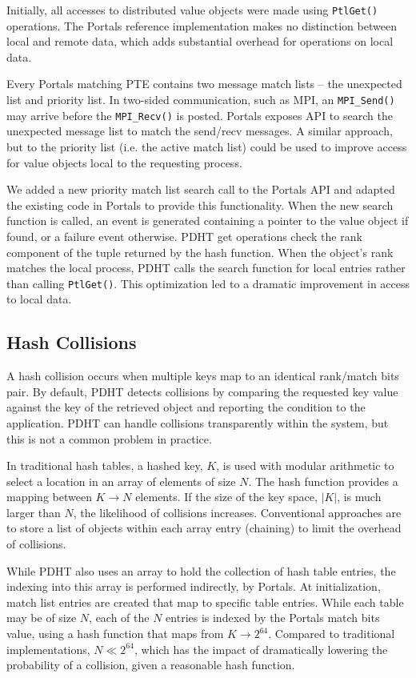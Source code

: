 {} Initially, all accesses to
distributed value objects were made using {\tt PtlGet()} operations. The
Portals reference implementation makes no distinction between local and remote
data, which adds substantial overhead for operations on local data.  

Every Portals matching PTE contains two message match lists -- the unexpected
list and priority list. In two-sided communication, such as MPI, an 
{\tt MPI\_Send()} may arrive before the {\tt MPI\_Recv()} is posted. Portals
exposes API to search the unexpected message list to match the send/recv 
messages. A similar approach, but to the priority list (i.e. the active match
list) could be used to improve access for value objects local to the requesting
process.

We added a new priority match list search call to the Portals API and adapted
the existing code in Portals to provide this functionality. When the new search
function is called, an event is generated containing a pointer to the value
object if found, or a failure event otherwise. PDHT get operations check the
rank component of the tuple returned by the hash function. When the object's
rank matches the local process, PDHT calls the search function for local
entries rather than calling {\tt PtlGet()}. This optimization led to a dramatic
improvement in access to local data.

\subsection{Hash Collisions} 

A hash collision occurs when multiple keys map to an identical rank/match bits
pair. By default, PDHT detects collisions by comparing the requested key value
against the key of the retrieved object and reporting the condition to the
application. PDHT can handle collisions transparently within the system, but
this is not a common problem in practice.

In traditional hash tables, a hashed key, $K$, is used with modular arithmetic
to select a location in an array of elements of size $N$. The hash function
provides a mapping between $K \rightarrow N$ elements.  If the size of the key
space, $|K|$, is much larger than $N$, the likelihood of collisions increases.
Conventional approaches are to store a list of objects within each array entry
(chaining) to limit the overhead of collisions.

While PDHT also uses an array to hold the collection of hash table entries, the
indexing into this array is performed indirectly, by Portals. At
initialization, match list entries are created that map to specific table
entries. While each table may be of size $N$, each of the $N$ entries is
indexed by the Portals match bits value, using a hash function that maps from
$K \rightarrow 2^{64}$. Compared to traditional implementations, $N \ll
2^{64}$, which has the impact of dramatically lowering the probability of a
collision, given a reasonable hash function.


